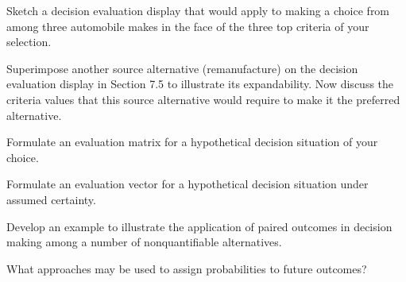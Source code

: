 \begin{exercises}
    \begin{exercise}
    \label{sea-7-23}
        Sketch a decision evaluation display that would apply to making a choice from among three automobile makes in the face of the three top criteria of your selection.
    \end{exercise}
    \begin{solution}
    \end{solution}
    
    \begin{exercise}
    \label{sea-7-24}
        Superimpose another source alternative (remanufacture) on the decision evaluation display in Section 7.5 to illustrate its expandability. Now discuss the criteria values that this source alternative would require to make it the preferred alternative.
    \end{exercise}
    \begin{solution}
    \end{solution}
    
    \begin{exercise}
    \label{sea-7-25}
        Formulate an evaluation matrix for a hypothetical decision situation of your choice.
    \end{exercise}
    \begin{solution}
    \end{solution}
    
    \begin{exercise}
    \label{sea-7-26}
        Formulate an evaluation vector for a hypothetical decision situation under assumed certainty.
    \end{exercise}
    \begin{solution}
    \end{solution}
    
    \begin{exercise}
    \label{sea-7-27}
        Develop an example to illustrate the application of paired outcomes in decision making among a number of nonquantifiable alternatives.
    \end{exercise}
    \begin{solution}
    \end{solution}
    
    \begin{exercise}
    \label{sea-7-28}
        What approaches may be used to assign probabilities to future outcomes?
    \end{exercise}
    \begin{solution}
    \end{solution}
    

\end{exercises}
